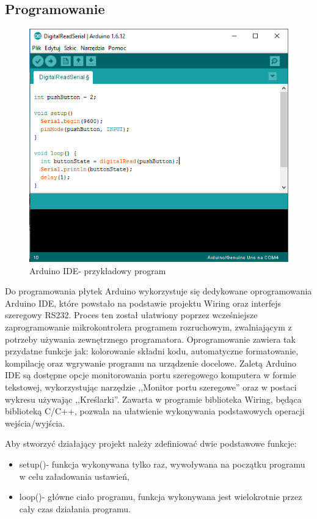 \subsection{Programowanie}%
\begin{figure}[H]
	\centering
	\includegraphics[scale=0.8]{pictures/arduinoIDE.PNG}
	\caption{Arduino IDE- przykładowy program}
	\label{ArduinoPodstawoweFunkcje}
\end{figure}
Do programowania płytek Arduino wykorzystuje się dedykowane oprogramowania Arduino IDE, które powstało na podstawie projektu Wiring oraz interfejs szeregowy RS232. Proces ten został ułatwiony poprzez wcześniejsze zaprogramowanie mikrokontrolera programem rozruchowym, zwalniającym z potrzeby używania zewnętrznego programatora. Oprogramowanie zawiera tak przydatne funkcje jak: kolorowanie składni kodu, automatyczne formatowanie, kompilację oraz wgrywanie programu na urządzenie docelowe. Zaletą Arduino IDE są dostępne opcje monitorowania portu szeregowego komputera w formie tekstowej, wykorzystując narzędzie ,,Monitor portu szeregowe'' oraz w postaci wykresu używając ,,Kreślarki''. Zawarta w programie biblioteka Wiring, będąca biblioteką C/C++, pozwala na ułatwienie wykonywania podstawowych operacji wejścia/wyjścia.

Aby stworzyć działający projekt należy zdefiniować dwie podstawowe funkcje:
\begin{itemize}
\item setup()- funkcja wykonywana tylko raz, wywoływana na początku programu w celu załadowania ustawień,
\item loop()- główne ciało programu, funkcja wykonywana jest wielokrotnie przez cały czas działania programu.
\end{itemize}


